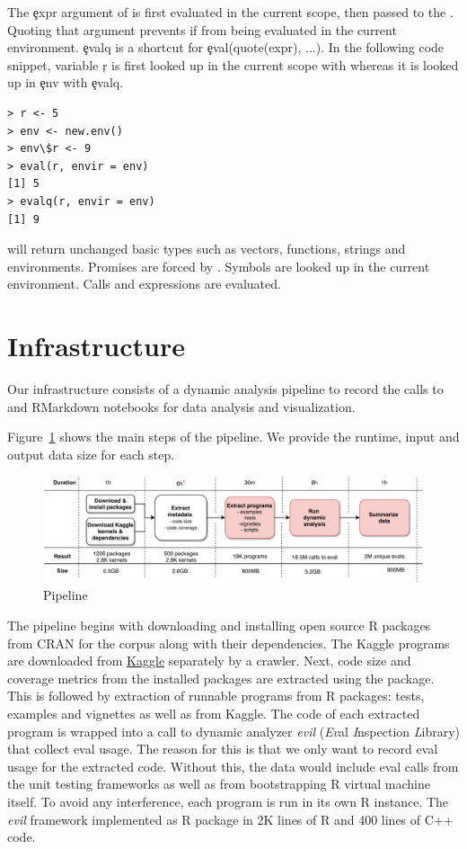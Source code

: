 \documentclass[conference]{IEEEtran}
\begin{document}
The \c{expr} argument of \eval is first evaluated in the current scope, then passed to the \eval. Quoting that argument prevents if from being evaluated in the current environment. \c{evalq} is a shortcut for \c{eval(quote(expr), ...)}. In the following code snippet, variable \c{r} is first looked up in the current scope with \eval whereas it is looked up in \c{env} with \c{evalq}.

\begin{lstlisting}
> r <- 5
> env <- new.env()
> env\$r <- 9
> eval(r, envir = env)
[1] 5
> evalq(r, envir = env)
[1] 9
\end{lstlisting}

\eval will return unchanged basic types such as vectors, functions, strings and environments. Promises are forced by \eval. Symbols are looked up in the current environment. Calls and expressions are evaluated. 


\section{Infrastructure}

Our infrastructure consists of a dynamic analysis pipeline to record the calls
to \eval and RMarkdown notebooks for data analysis and visualization.

Figure~\ref{fig:pipeline} shows the main steps of the pipeline. We provide the
runtime, input and output data size for each step.

\begin{figure}[!tb]\centering\includegraphics[width=\linewidth]
{pipeline.pdf}\caption{Pipeline}\label{fig:pipeline}
\end{figure}

The pipeline begins with downloading and installing open source R packages from
CRAN for the corpus along with their dependencies. The Kaggle programs are
downloaded from \href{http://www.kaggle.com}{Kaggle} separately by a crawler.
Next, code size and coverage metrics from the installed packages are extracted
using the \href{ https://github.com/r-lib/covr}{\covr} package. This is followed
by extraction of runnable programs from R packages: tests, examples and
vignettes as well as from Kaggle. The code of each extracted program is wrapped
into a call to dynamic analyzer \emph{evil} (\emph{Ev}al \emph{I}nspection
\emph{L}ibrary) that collect eval usage. The reason for this is that we only
want to record eval usage for the extracted code. Without this, the data would
include eval calls from the unit testing frameworks as well as from
bootstrapping R virtual machine itself. To avoid any interference, each program
is run in its own R instance. The \emph{evil} framework implemented as R package
in 2K lines of R and 400 lines of C++ code.
\end{document}
